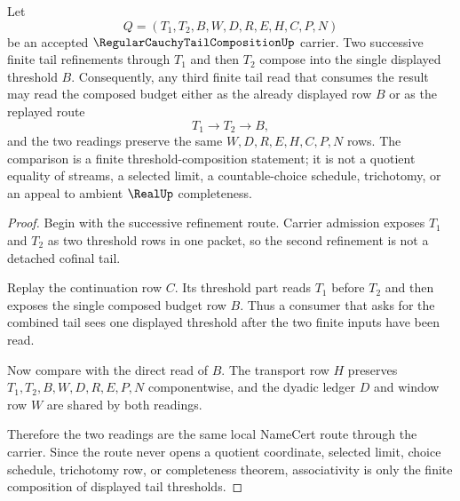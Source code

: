 \begin{theorem}
\label{thm:regular-cauchy-tail-composition-tail-budget-associativity}
Let
$$
Q=(T_1,T_2,B,W,D,R,E,H,C,P,N)
$$
be an accepted $\RegularCauchyTailCompositionUp$ carrier. Two successive finite tail refinements through $T_1$ and then $T_2$ compose into the single displayed threshold $B$. Consequently, any third finite tail read that consumes the result may read the composed budget either as the already displayed row $B$ or as the replayed route
$$
T_1 \longrightarrow T_2 \longrightarrow B,
$$
and the two readings preserve the same $W,D,R,E,H,C,P,N$ rows. The comparison is a finite threshold-composition statement; it is not a quotient equality of streams, a selected limit, a countable-choice schedule, trichotomy, or an appeal to ambient $\RealUp$ completeness.
\end{theorem}
\begin{proof}
Begin with the successive refinement route. Carrier admission exposes $T_1$ and $T_2$ as two threshold rows in one packet, so the second refinement is not a detached cofinal tail.

Replay the continuation row $C$. Its threshold part reads $T_1$ before $T_2$ and then exposes the single composed budget row $B$. Thus a consumer that asks for the combined tail sees one displayed threshold after the two finite inputs have been read.

Now compare with the direct read of $B$. The transport row $H$ preserves $T_1,T_2,B,W,D,R,E,P,N$ componentwise, and the dyadic ledger $D$ and window row $W$ are shared by both readings.

Therefore the two readings are the same local NameCert route through the carrier. Since the route never opens a quotient coordinate, selected limit, choice schedule, trichotomy row, or completeness theorem, associativity is only the finite composition of displayed tail thresholds.
\end{proof}

